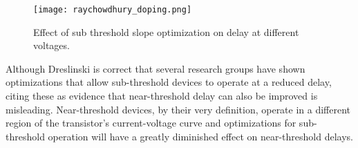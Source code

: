 \begin{figure}[thpb]
    \centering
    \texttt{[image: raychowdhury\_doping.png]}
    \caption{Effect of sub threshold slope optimization on delay at different voltages.~\cite{Raychowdhury:2006fu}}
    \label{fig:doping}
\end{figure}
 
Although Dreslinski is correct that several research groups have shown optimizations that allow sub-threshold devices to operate at a reduced delay\cite{Dreslinski:2010ez}, citing these as evidence that near-threshold delay can also be improved is misleading. Near-threshold devices, by their very definition, operate in a different region of the transistor's current-voltage curve and optimizations for sub-threshold operation will have a greatly diminished effect on near-threshold delays.
